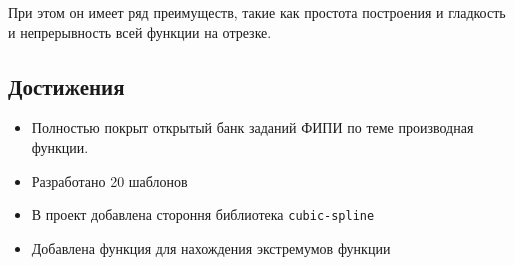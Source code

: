 \documentclass[a4paper, 12pt]{extarticle}
\begin{document}
При этом он имеет ряд преимуществ, такие как простота построения и гладкость и непрерывность всей функции на отрезке.  

\subsection*{Достижения}
\begin{itemize}
    \item Полностью покрыт открытый банк заданий ФИПИ по теме производная функции.
    \item Разработано 20 шаблонов
    \item В проект добавлена стороння библиотека \texttt{cubic-spline}
    \item Добавлена функция для нахождения экстремумов функции
\end{itemize}
\end{document}
